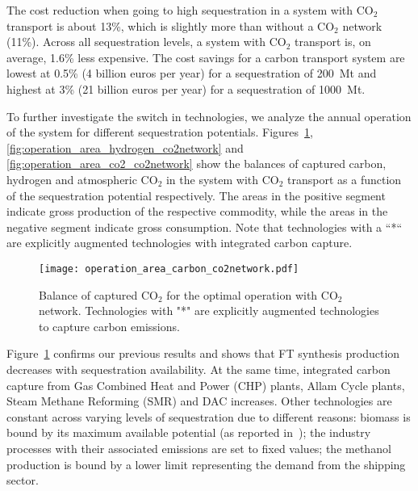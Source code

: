 \documentclass[twocolumn]{article}
\newcommand{\carbon}{CO$_2$}
\begin{document}
The cost reduction when going to high sequestration in a system with \carbon{} transport is about 13\%, which is slightly more than without a \carbon{} network (11\%). Across all sequestration levels, a system with \carbon{} transport is, on average, 1.6\% less expensive. The cost savings for a carbon transport system are lowest at 0.5\% (4 billion euros per year) for a sequestration of 200~Mt and highest at 3\% (21 billion euros per year) for a sequestration of 1000~Mt.


To further investigate the switch in technologies, we analyze the annual operation of the system for different sequestration potentials. Figures~\ref{fig:operation_area_carbon_co2network}, \ref{fig:operation_area_hydrogen_co2network} and \ref{fig:operation_area_co2_co2network} show the balances of captured carbon, hydrogen and atmospheric \carbon{} in the system with \carbon{} transport as a function of the sequestration potential respectively. The areas in the positive segment indicate gross production of the respective commodity, while the areas in the negative segment indicate gross consumption.
Note that technologies with a ``*`` are explicitly augmented technologies with integrated carbon capture.
%
\begin{figure}[h]
    \centering
    \texttt{[image: operation\_area\_carbon\_co2network.pdf]}
    \caption{Balance of captured \carbon{} for the optimal operation with \carbon{} network. Technologies with "*" are explicitly augmented technologies to capture carbon emissions.}
    \label{fig:operation_area_carbon_co2network}
\end{figure}


Figure~\ref{fig:operation_area_carbon_co2network} confirms our previous results and shows that FT synthesis production decreases with sequestration availability. At the same time, integrated carbon capture from Gas Combined Heat and Power (CHP) plants, Allam Cycle plants, Steam Methane Reforming (SMR) and DAC increases. Other technologies are constant across varying levels of sequestration due to different reasons: biomass is bound by its maximum available potential (as reported in~\cite{europeancommissionjointresearchcentreENSPRESOBIOMASS2019}); the industry processes with their associated emissions are set to fixed values; the methanol production is bound by a lower limit representing the demand from the shipping sector.
\end{document}
